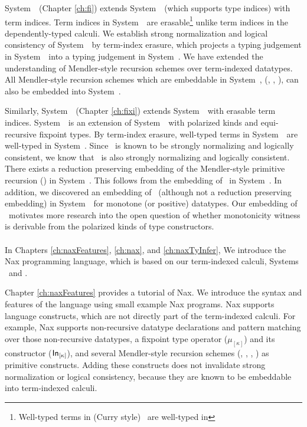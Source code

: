 System~\Fi\ (Chapter \ref{ch:fi}) extends System~\Fw\ (which supports
type indices) with term indices. Term indices in System~\Fi\ are 
erasable\footnote{Well-typed terms in (Curry style) \Fi\ are well-typed in \Fw} unlike term indices in the dependently-typed calculi. We establish
strong normalization and logical consistency of System~\Fi\ by
term-index erasure, which projects a typing judgement in System~\Fi\ into
a typing judgement in System~\Fw. We have extended the understanding of
Mendler-style recursion schemes over term-indexed datatypes. All
Mendler-style recursion schemes which are embeddable in System~\Fw,
(\eg, \MIt, \MsfIt), can also be embedded into System~\Fi.

Similarly, System~\Fixi\ (Chapter \ref{ch:fixi}) extends System~\Fixw\ with
erasable term indices. System~\Fixw\ is an extension of System~\Fw\ with
polarized kinds and equi-recursive fixpoint types. By term-index erasure,
well-typed terms in System~\Fixi\ are well-typed in System~\Fixw.
Since \Fixw\ is known to be strongly normalizing and logically consistent,
we know that \Fixi\ is also strongly normalizing and logically consistent.
There exists a reduction preserving embedding of the Mendler-style
primitive recursion (\MPr) in System~\Fixi. This follows from
the embedding of \MPr\ in System~\Fixw. In addition, we discovered
an embedding of \McvPr\ (although not a reduction preserving embedding)
in System~\Fixi\ for monotone (or positive) datatypes. Our embedding of
\McvPr\ motivates more research into the open question of whether
monotonicity witness is derivable from the polarized kinds of type constructors.

\paragraph{}
In Chapters \ref{ch:naxFeatures}, \ref{ch:nax}, and \ref{ch:naxTyInfer},
We introduce the Nax programming language, which is based on
our term-indexed calculi, Systems \Fi\ and \Fixi.

Chapter \ref{ch:naxFeatures} provides a tutorial of Nax.
We introduce the syntax and features of the language
using small example Nax programs. Nax supports language constructs,
which are not directly part of the term-indexed calculi.
For example, Nax supports non-recursive datatype declarations and
pattern matching over those non-recursive datatypes,
a fixpoint type operator ($\mu_{[\kappa]}$) and
its constructor ($\mathsf{In}_{[\kappa]}$), and
several Mendler-style recursion schemes (\MIt, \MPr, \McvPr, \MsfIt)
as primitive constructs. Adding these constructs does not invalidate
strong normalization or logical consistency, because they are known to
be embeddable into term-indexed calculi.

